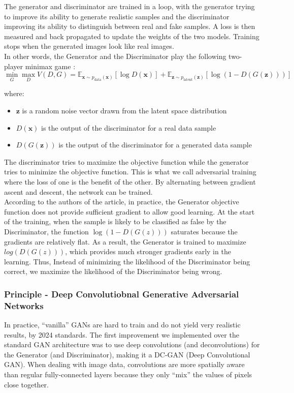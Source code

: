 \documentclass{article}
\begin{document}
The generator and discriminator are trained in a loop, with the generator trying to improve its ability to generate realistic samples and the discriminator improving its ability to distinguish between real and fake samples. 
A loss is then measured and back propagated to update the weights of the two models. 
Training stops when the generated images look like real images.\\
In other words, the Generator and the Discriminator play the following two-player minimax game :
$$ \min_G \max_D V(D, G) = \mathbb{E}_{\mathbf{x} \sim p_{\text{data}}(\mathbf{x})} [\log D(\mathbf{x})] + \mathbb{E}_{\mathbf{z} \sim p_{\text{latent}}(\mathbf{z})} [\log (1 - D(G(\mathbf{z})))] $$

where:

\begin{itemize}
    \item $\mathbf{z}$ is a random noise vector drawn from the latent space distribution 
    \item $D(\mathbf{x})$ is the output of the discriminator for a real data sample
    \item $D(G(\mathbf{z}))$ is the output of the discriminator for a generated data sample
\end{itemize}

The discriminator tries to maximize the objective function while the generator tries to minimize the objective function. This is what we call adversarial training where the loss of one is the benefit of the other. By alternating between gradient ascent and descent, the network can be trained.\\

According to the authors of the article, in practice, the Generator objective function does not provide sufficient gradient to allow good learning. At the start of the training, when the sample is likely to be classified as false by the Discriminator, the function $\log(1 - D(G(z)))$  saturates because the gradients are relatively flat. As a result, the Generator is trained to maximize $log(D(G(z)))$, which provides much stronger gradients early in the learning. Thus, Instead of minimizing the likelihood of the Discriminator being correct, we maximize the likelihood of the Discriminator being wrong. 

\subsubsection*{Principle - Deep Convolutiobnal Generative Adversarial Networks}
In practice, “vanilla” GANs are hard to train and do not yield very realistic results, by 2024 standards. The first improvement we implemented over the standard GAN architecture was to use deep convolutions (and deconvolutions) for the Generator (and Discriminator), making it a DC-GAN (Deep Convolutional GAN). When dealing with image data, convolutions are more spatially aware than regular fully-connected layers because they only “mix” the values of pixels close together.
\end{document}
